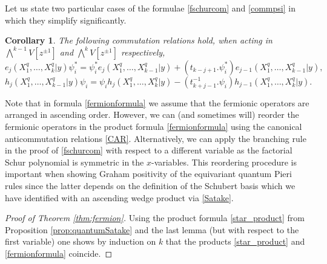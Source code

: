\documentclass[12pt]{amsart}
\newtheorem{cor}[prop]{Corollary}
\numberwithin{equation}{section}
\numberwithin{figure}{section}
\begin{document}
    Let us state two particular cases of the formulae \eqref{fschurcom} and \eqref{commpsi} in which they simplify significantly.
    \begin{cor}
        The following commutation relations hold, when acting in $\bigwedge^{k - 1}V[z^{\pm1}]$ and $\bigwedge^{k}V[z^{\pm1}]$ respectively,
        \begin{equation}
        \label{elemcom}
            e_j(X_1^q, \ldots, X_k^q|y) \psi^*_i = \psi^*_i e_j(X_1^q, \ldots, X_{k - 1}^q|y) + (t_{k - j + 1}.\psi_i^*)e_{j - 1}(X_1^q, \ldots, X_{k - 1}^q|y),
        \end{equation}
        \begin{equation}
        \label{compcom}
            h_j(X_1^q, \ldots, X_{k - 1}^q|y) \psi_i = \psi_i h_j(X_1^q, \ldots, X_k^q|y) - (t^{-1}_{k + j - 1}.\psi_i)h_{j - 1}(X_1^q, \ldots, X_k^q|y).
        \end{equation}
    \end{cor}
    Note that in formula \eqref{fermionformula} we assume that the fermionic operators are arranged in ascending order. However, we can (and sometimes will) reorder the fermionic operators in the product formula \eqref{fermionformula} using the canonical anticommutation relations \eqref{CAR}. Alternatively, we can apply the branching rule in the proof of \eqref{fschurcom} with respect to a different variable as the factorial Schur polynomial is symmetric in the $x$-variables. This reordering procedure is important when showing Graham positivity of the equivariant quantum Pieri rules since the latter depends on the definition of the Schubert basis which we have identified with an ascending wedge product via \eqref{Satake}.
\begin{proof}[Proof of Theorem \ref{thm:fermion}]
    Using the product formula \eqref{star_product} from Proposition \ref{prop:quantumSatake} and the last lemma (but with respect to the first variable) one shows by induction on $k$ that the products \eqref{star_product} and \eqref{fermionformula} coincide.
\end{proof}
\end{document}
